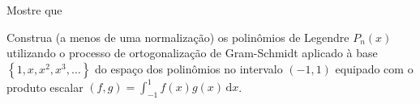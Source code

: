 \documentclass[a4paper,12pt, leqno, answers]{exam}
\begin{document}
\begin{questions}

    \question Mostre que

    \question Construa (a menos de uma normaliza\c{c}\~{a}o) os polinômios de Legendre $P_n(x)$ utilizando o processo de ortogonaliza\c{c}\~{a}o de Gram-Schmidt aplicado \`{a} base $\left\{ 1, x, x^2, x^3, \ldots \right\}$ do espa\c{c}o dos polinômios no intervalo $(-1, 1)$ equipado com o produto escalar $(f, g) = \int_{-1}^1 f(x) g(x) \,\mathrm{d} x$.
    \begin{solution}
        

\end{solution}
\end{questions}
\end{document}
